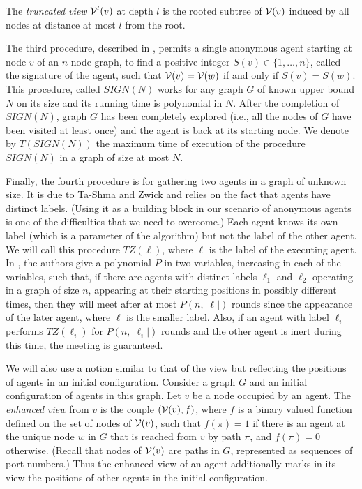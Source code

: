 \documentclass[11pt]{article}
\newcommand{\cV}{{\cal V}}
\begin{document}
The {\em truncated view} $\cV^l(v)$ at depth $l$ is the rooted subtree of  $\cV(v)$ induced by all nodes at distance  at most $l$ from the root.


The third procedure, described in \cite{CKP},  permits a single anonymous agent starting at node $v$ of an $n$-node graph, to find a  positive integer $S(v) \in \{1,\dots , n\}$,
called the signature of the agent, such that 
$\cV(v)= \cV(w)$ if and only if $S(v)=S(w)$. This procedure, called $SIGN(N)$ works for any graph $G$ of known upper bound $N$ on its size and 
its running time is polynomial in $N$. After the completion of $SIGN(N)$, {graph $G$ has been completely explored (i.e., all the nodes of $G$ have been visited at least once) and} the agent is back at its starting node.
We denote by $T(SIGN(N))$ the maximum time of execution of the procedure $SIGN(N)$ in a graph of size at most $N$.


Finally, the fourth procedure is for gathering two agents in a graph of unknown size. It is due to Ta-Shma and Zwick \cite{TSZ14} and relies on the
fact that agents have distinct labels. (Using it as a building block in our scenario of anonymous agents is one of the difficulties that we need to overcome.)
Each agent knows its own label (which is a parameter of the algorithm) but not the label of the other agent.
We will call this procedure $TZ(\ell)$, where $\ell$ is the label of the executing agent. In  \cite{TSZ14}, the authors give a polynomial $P$
in two variables, increasing in each of the variables,
such that, if there are agents with distinct labels $\ell_1$ and $\ell_2$ operating in a graph of size $n$, appearing at their starting positions in possibly
different times, then they will meet after at most $P(n,|\ell|)$ rounds since the appearance of the later agent, where $\ell$ is the smaller label.
Also, if an agent with label $\ell_i$  performs $TZ(\ell_i)$ for $P(n,|\ell_i|)$ rounds and the other agent is inert during this time, the meeting is guaranteed.

We will also use a notion similar to that of the view but reflecting the positions of agents in an initial configuration.
Consider a graph $G$ and an initial configuration of agents in this graph. Let $v$ be a node occupied by an agent. The {\em enhanced view} from $v$ is the couple 
 $(\cV(v),f)$, where $f$ is a binary valued function defined on the set of nodes of $\cV(v)$, such that $f(\pi)=1$ if there is an agent at the unique node $w$ in $G$
 that is reached from $v$ by path $\pi$, and $f(\pi)=0$ otherwise. (Recall that nodes of $\cV(v)$ are paths in $G$, represented as sequences of port numbers.)
 Thus the enhanced view of an agent additionally marks in its view the positions of other agents in the initial configuration.
 
\end{document}
